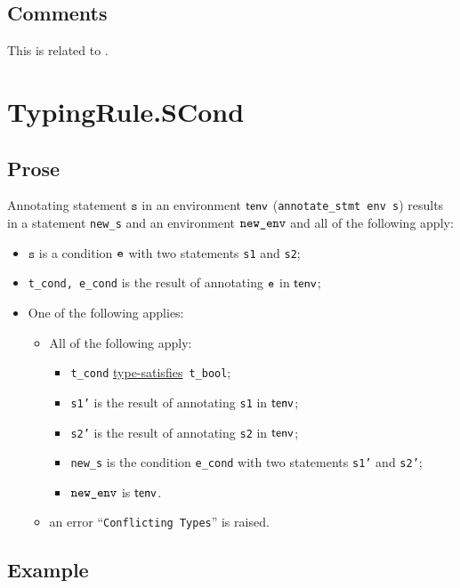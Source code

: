 \documentclass{book}
\newcommand\typesatisfies[0]{\hyperlink{def-typesatisfies}{type-satisfies}}
\newcommand\vs[0]{\texttt{s}}
\begin{document}
\subsection{Comments}
  This is related to .

\section{TypingRule.SCond \label{sec:TypingRule.SCond}}

  \subsection{Prose}
Annotating statement $\vs$ in an environment $\textsf{tenv}$
(\texttt{annotate\_stmt env s}) results in a statement \texttt{new\_s} and an
environment $\texttt{new\_env}$ and all of the following apply:
   \begin{itemize}
   \item $\vs$ is a condition $\texttt{e}$ with two statements \texttt{s1} and \texttt{s2};
   \item \texttt{t\_cond, e\_cond} is the result of annotating $\texttt{e}$ in $\textsf{tenv}$;
   \item One of the following applies:
     \begin{itemize}
     \item All of the following apply:
       \begin{itemize}
       \item \texttt{t\_cond} \typesatisfies\  \texttt{t\_bool};
       \item \texttt{s1'} is the result of annotating \texttt{s1} in $\textsf{tenv}$;
       \item \texttt{s2'} is the result of annotating \texttt{s2} in $\textsf{tenv}$;
       \item \texttt{new\_s} is the condition \texttt{e\_cond} with two statements \texttt{s1'} and \texttt{s2'};
       \item $\texttt{new\_env}$ is $\textsf{tenv}$.
       \end{itemize}
     \item an error ``\texttt{Conflicting Types}'' is raised.
     \end{itemize}
   \end{itemize}

  \subsection{Example}


\end{document}
